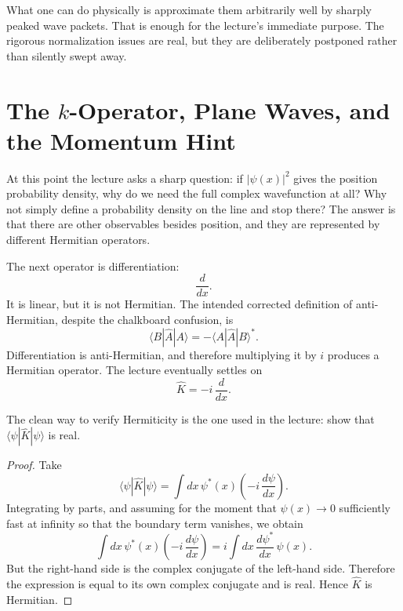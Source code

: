 What one can do physically is approximate them arbitrarily well by sharply peaked wave packets. That is enough for the lecture's immediate purpose. The rigorous normalization issues are real, but they are deliberately postponed rather than silently swept away.

\section{The \texorpdfstring{$k$}{k}-Operator, Plane Waves, and the Momentum Hint}

At this point the lecture asks a sharp question: if \(|\psi(x)|^2\) gives the position probability density, why do we need the full complex wavefunction at all? Why not simply define a probability density on the line and stop there? The answer is that there are other observables besides position, and they are represented by different Hermitian operators.

The next operator is differentiation:
\begin{equation}
\frac{d}{dx}.
\end{equation}
It is linear, but it is not Hermitian. The intended corrected definition of anti-Hermitian, despite the chalkboard confusion, is
\begin{equation}
\langle B|\hat A|A\rangle = -\langle A|\hat A|B\rangle^*.
\end{equation}
Differentiation is anti-Hermitian, and therefore multiplying it by \(i\) produces a Hermitian operator. The lecture eventually settles on
\begin{equation}
\hat K = -i\,\frac{d}{dx}.
\end{equation}

The clean way to verify Hermiticity is the one used in the lecture: show that \(\langle \psi|\hat K|\psi\rangle\) is real.

\begin{proof}
Take
\begin{equation}
\langle \psi|\hat K|\psi\rangle
=
\int dx\, \psi^*(x)\left(-i\,\frac{d\psi}{dx}\right).
\end{equation}
Integrating by parts, and assuming for the moment that \(\psi(x)\to 0\) sufficiently fast at infinity so that the boundary term vanishes, we obtain
\begin{equation}
\int dx\, \psi^*(x)\left(-i\,\frac{d\psi}{dx}\right)
=
i\int dx\, \frac{d\psi^*}{dx}\,\psi(x).
\end{equation}
But the right-hand side is the complex conjugate of the left-hand side. Therefore the expression is equal to its own complex conjugate and is real. Hence \(\hat K\) is Hermitian.
\end{proof}

